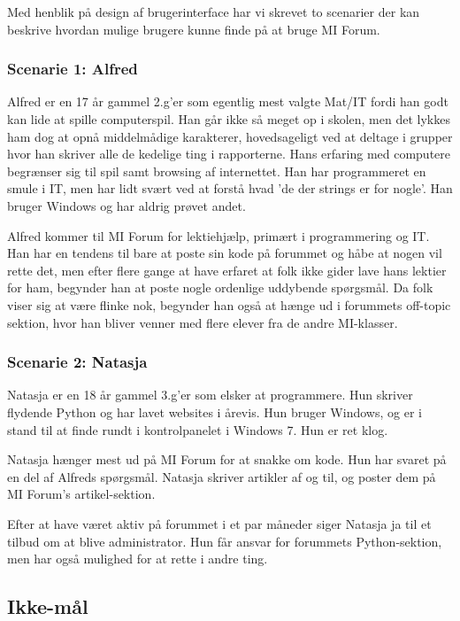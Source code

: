 \documentclass{article}
\begin{document}
Med henblik på design af brugerinterface har vi skrevet to scenarier der kan beskrive hvordan mulige brugere kunne finde på at bruge MI Forum.

\subsubsection*{Scenarie 1: Alfred}
Alfred er en 17 år gammel 2.g'er som egentlig mest valgte Mat/IT fordi han godt kan lide at spille computerspil. Han går ikke så meget op i skolen, men det lykkes ham dog at opnå middelmådige karakterer, hovedsageligt ved at deltage i grupper hvor han skriver alle de kedelige ting i rapporterne. Hans erfaring med computere begrænser sig til spil samt browsing af internettet. Han har programmeret en smule i IT, men har lidt svært ved at forstå hvad 'de der strings er for nogle'. Han bruger Windows og har aldrig prøvet andet.

Alfred kommer til MI Forum for lektiehjælp, primært i programmering og IT. Han har en tendens til bare at poste sin kode på forummet og håbe at nogen vil rette det, men efter flere gange at have erfaret at folk ikke gider lave hans lektier for ham, begynder han at poste nogle ordenlige uddybende spørgsmål. Da folk viser sig at være flinke nok, begynder han også at hænge ud i forummets off-topic sektion, hvor han bliver venner med flere elever fra de andre MI-klasser.

\subsubsection*{Scenarie 2: Natasja}
Natasja er en 18 år gammel 3.g'er som elsker at programmere. Hun skriver flydende Python og har lavet websites i årevis. Hun bruger Windows, og er i stand til at finde rundt i kontrolpanelet i Windows 7. Hun er ret klog.

Natasja hænger mest ud på MI Forum for at snakke om kode. Hun har svaret på en del af Alfreds spørgsmål. Natasja skriver artikler af og til, og poster dem på MI Forum's artikel-sektion.

Efter at have været aktiv på forummet i et par måneder siger Natasja ja til et tilbud om at blive administrator. Hun får ansvar for forummets Python-sektion, men har også mulighed for at rette i andre ting.

\subsection{Ikke-mål}
\end{document}
